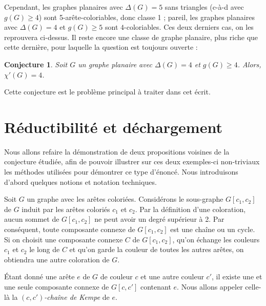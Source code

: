 \documentclass[10pt,a4paper]{article}
\newtheorem{conjecture}{Conjecture}
\begin{document}
Cependant, les graphes planaires avec $\Delta(G)=5$ sans triangles (c-à-d avec $g(G)\ge 4$) sont 5-arête-coloriables, donc classe 1 ; pareil, les graphes planaires avec $\Delta(G) = 4$ et $g(G)\ge 5$ sont $4$-coloriables. Ces deux derniers cas, on les reprouvera ci-dessus. Il reste encore une classe de graphe planaire, plus riche que cette dernière, pour laquelle la question est toujours ouverte :

\begin{conjecture}
Soit $G$ un graphe planaire avec $\Delta(G) = 4$ et $g(G) \geq 4$. Alors, $\chi'(G) = 4$. 
\end{conjecture} 

Cette conjecture est le problème principal à traiter dans cet écrit. 

\section{Réductibilité et déchargement}
\label{chap:easy}

Nous allons refaire la démonstration de deux propositions voisines de la conjecture étudiée, afin de pouvoir illustrer sur ces deux exemples-ci non-triviaux les méthodes utilisées pour démontrer ce type d'énoncé. Nous introduisons d'abord quelques notions et notation techniques.

Soit $G$ un graphe avec les arêtes coloriées. 
Considérons le sous-graphe $G[c_1,c_2]$ de $G$ induit par les arêtes coloriés $c_1$ et $c_2$. Par la définition d'une coloration, aucun sommet de $G[c_1,c_2]$ ne peut avoir un degré supérieur à 2. Par conséquent, toute composante connexe de $G[c_1,c_2]$ est une chaîne ou un cycle. Si on choisit une composante connexe $C$ de $G[c_1,c_2]$, qu'on échange les couleurs $c_1$ et $c_2$ le long de $C$ et qu'on garde la couleur de toutes les autres arêtes, on obtiendra une autre coloration de $G$.

Étant donné une arête $e$ de $G$ de couleur $c$ et une autre couleur $c'$, il existe une et une seule composante connexe de $G[c,c']$ contenant $e$.
Nous allons appeler celle-là la \emph{$(c,c')$-chaîne de Kempe} de $e$.


\end{document}
